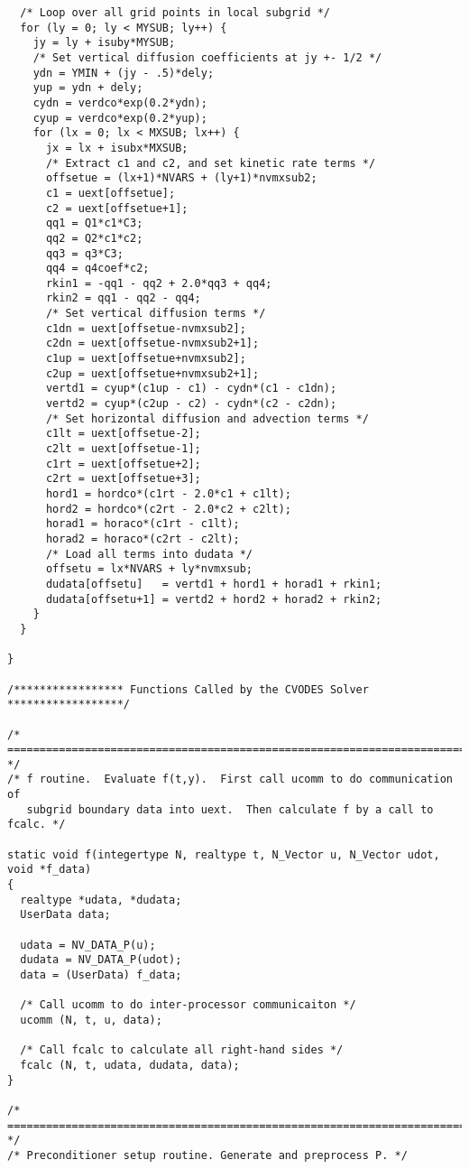 \begin{verbatim}
  /* Loop over all grid points in local subgrid */
  for (ly = 0; ly < MYSUB; ly++) {
    jy = ly + isuby*MYSUB;
    /* Set vertical diffusion coefficients at jy +- 1/2 */
    ydn = YMIN + (jy - .5)*dely;
    yup = ydn + dely;
    cydn = verdco*exp(0.2*ydn);
    cyup = verdco*exp(0.2*yup);
    for (lx = 0; lx < MXSUB; lx++) {
      jx = lx + isubx*MXSUB;
      /* Extract c1 and c2, and set kinetic rate terms */
      offsetue = (lx+1)*NVARS + (ly+1)*nvmxsub2;
      c1 = uext[offsetue];
      c2 = uext[offsetue+1];
      qq1 = Q1*c1*C3;
      qq2 = Q2*c1*c2;
      qq3 = q3*C3;
      qq4 = q4coef*c2;
      rkin1 = -qq1 - qq2 + 2.0*qq3 + qq4;
      rkin2 = qq1 - qq2 - qq4;
      /* Set vertical diffusion terms */
      c1dn = uext[offsetue-nvmxsub2];
      c2dn = uext[offsetue-nvmxsub2+1];
      c1up = uext[offsetue+nvmxsub2];
      c2up = uext[offsetue+nvmxsub2+1];
      vertd1 = cyup*(c1up - c1) - cydn*(c1 - c1dn);
      vertd2 = cyup*(c2up - c2) - cydn*(c2 - c2dn);
      /* Set horizontal diffusion and advection terms */
      c1lt = uext[offsetue-2];
      c2lt = uext[offsetue-1];
      c1rt = uext[offsetue+2];
      c2rt = uext[offsetue+3];
      hord1 = hordco*(c1rt - 2.0*c1 + c1lt);
      hord2 = hordco*(c2rt - 2.0*c2 + c2lt);
      horad1 = horaco*(c1rt - c1lt);
      horad2 = horaco*(c2rt - c2lt);
      /* Load all terms into dudata */
      offsetu = lx*NVARS + ly*nvmxsub;
      dudata[offsetu]   = vertd1 + hord1 + horad1 + rkin1; 
      dudata[offsetu+1] = vertd2 + hord2 + horad2 + rkin2;
    }
  }

}

/***************** Functions Called by the CVODES Solver ******************/

/* ======================================================================= */
/* f routine.  Evaluate f(t,y).  First call ucomm to do communication of 
   subgrid boundary data into uext.  Then calculate f by a call to fcalc. */

static void f(integertype N, realtype t, N_Vector u, N_Vector udot, void *f_data)
{
  realtype *udata, *dudata;
  UserData data;

  udata = NV_DATA_P(u);
  dudata = NV_DATA_P(udot);
  data = (UserData) f_data;

  /* Call ucomm to do inter-processor communicaiton */
  ucomm (N, t, u, data);

  /* Call fcalc to calculate all right-hand sides */
  fcalc (N, t, udata, dudata, data);
}

/* ======================================================================= */
/* Preconditioner setup routine. Generate and preprocess P. */


\end{verbatim}
